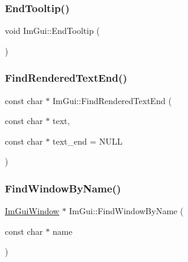 \hypertarget{namespace_im_gui_ac8d75c160cfdf43d512f773ca133a1c6}{}\label{namespace_im_gui_ac8d75c160cfdf43d512f773ca133a1c6} 
\subsubsection{\texorpdfstring{End\+Tooltip()}{EndTooltip()}}
{\footnotesize\ttfamily void Im\+Gui\+::\+End\+Tooltip (\begin{DoxyParamCaption}{ }\end{DoxyParamCaption})}

\hypertarget{namespace_im_gui_a7671e1dbc803a31b06081b52a771d83f}{}\label{namespace_im_gui_a7671e1dbc803a31b06081b52a771d83f} 
\subsubsection{\texorpdfstring{Find\+Rendered\+Text\+End()}{FindRenderedTextEnd()}}
{\footnotesize\ttfamily const char $\ast$ Im\+Gui\+::\+Find\+Rendered\+Text\+End (\begin{DoxyParamCaption}\item[{const char $\ast$}]{text,  }\item[{const char $\ast$}]{text\+\_\+end = {\ttfamily NULL} }\end{DoxyParamCaption})}

\hypertarget{namespace_im_gui_abca25f22c02e73d5eb2e9c72c4557813}{}\label{namespace_im_gui_abca25f22c02e73d5eb2e9c72c4557813} 
\subsubsection{\texorpdfstring{Find\+Window\+By\+Name()}{FindWindowByName()}}
{\footnotesize\ttfamily \hyperlink{struct_im_gui_window}{Im\+Gui\+Window} $\ast$ Im\+Gui\+::\+Find\+Window\+By\+Name (\begin{DoxyParamCaption}\item[{const char $\ast$}]{name }\end{DoxyParamCaption})}

\hypertarget{namespace_im_gui_ab1e2f7069edbab669b56e93e30930c45}{}\label{namespace_im_gui_ab1e2f7069edbab669b56e93e30930c45} 
